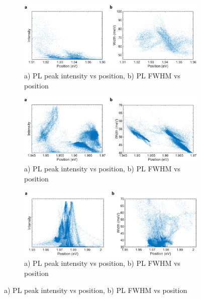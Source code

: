 \begin{figure}[H]
	\begin{center}
		\begin{subfigure}[b]{0.8\textwidth}
			\includegraphics[scale=0.3]{PaperSIScatterWO3.png}
			\caption{a) PL peak intensity vs position, b) PL FWHM vs position}
			\label{fig:PaperSIScatterWO3}
		\end{subfigure}

		\begin{subfigure}[b]{0.8\textwidth}
			\includegraphics[scale=0.3]{PaperSIScatterWO3NaCl.png}
			\caption{a) PL peak intensity vs position, b) PL FWHM vs position}
			\label{fig:PaperSIScatterWO3NaCl}
		\end{subfigure}

		\begin{subfigure}[b]{0.8\textwidth}
			\includegraphics[scale=0.3]{PaperSIScatterH2WO4NaCl.png}
			\caption{a) PL peak intensity vs position, b) PL FWHM vs position}
			\label{fig:PaperSIScatterH2WO4NaCl}
		\end{subfigure}


\end{center}
\end{figure}
